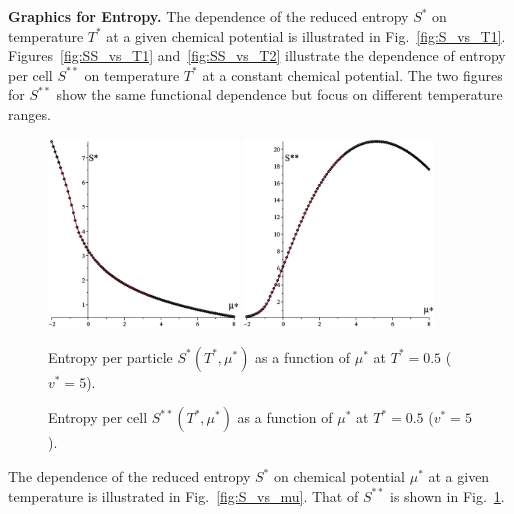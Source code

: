 \documentclass[12pt]{article}
\numberwithin{equation}{section}
\begin{document}
	\textbf{Graphics for Entropy.} The dependence of the reduced entropy $S^*$ on temperature $T^*$ at a given chemical potential is illustrated in Fig.~\ref{fig:S_vs_T1}. Figures~\ref{fig:SS_vs_T1} and~\ref{fig:SS_vs_T2} illustrate the dependence of entropy per cell $S^{**}$ on temperature $T^*$ at a constant chemical potential. The two figures for $S^{**}$ show the same functional dependence but focus on different temperature ranges.
	
	\begin{figure}[htbp]
		\includegraphics[width=0.45\textwidth,angle=0]{S_vs_mu}
		\hfill
		\includegraphics[width=0.45\textwidth,angle=0]{SS_vs_mu}
		\\
		\parbox{0.45\textwidth}{\caption{\label{fig:S_vs_mu} Entropy per particle $S^{*}(T^*,\mu^*)$ as a function of $\mu^*$ at $T^*=0.5$ ($v^* = 5$).}}
		\hfill
		\parbox{0.45\textwidth}{\caption{\label{fig:SS_vs_mu} Entropy per cell $S^{**}(T^*,\mu^*)$ as a function of $\mu^*$ at $T^*=0.5$ ($v^* = 5$).}}
	\end{figure}
	
	The dependence of the reduced entropy $S^*$ on chemical potential $\mu^*$ at a given temperature is illustrated in Fig.~\ref{fig:S_vs_mu}. That of $S^{**}$ is shown in Fig.~\ref{fig:SS_vs_mu}.
	
\end{document}
